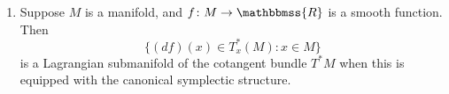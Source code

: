 \documentclass[12pt]{article}
\newcommand{\R}{\mathbbmss{R}}
\begin{document}
\begin{enumerate}
\item Suppose $M$ is a manifold, and $f\colon M\to \R$ is a smooth function.
Then 
$$
   \{ (df)(x)\in T^\ast _x(M) : x\in M\}
$$
is a Lagrangian submanifold of the cotangent bundle $T^\ast M$ when 
this is equipped with the canonical symplectic structure. 
\end{enumerate}
\end{document}
